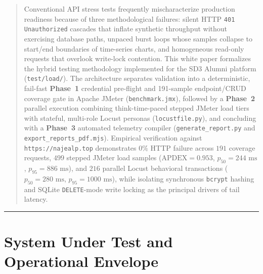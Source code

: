 \documentclass[11pt,letterpaper]{article}
\begin{document}
\begin{abstract}
\noindent Conventional API stress tests frequently mischaracterize production readiness because of three methodological failures: silent HTTP \texttt{401 Unauthorized} cascades that inflate synthetic throughput without exercising database paths, unpaced burst loops whose samples collapse to start/end boundaries of time-series charts, and homogeneous read-only requests that overlook write-lock contention. This white paper formalizes the hybrid testing methodology implemented for the SD3 Alumni platform (\texttt{test/load/}). The architecture separates validation into a deterministic, fail-fast \textbf{Phase~1} credential pre-flight and 191-sample endpoint/CRUD coverage gate in Apache JMeter (\texttt{benchmark.jmx}), followed by a \textbf{Phase~2} parallel execution combining think-time-paced stepped JMeter load tiers with stateful, multi-role Locust personas (\texttt{locustfile.py}), and concluding with a \textbf{Phase~3} automated telemetry compiler (\texttt{generate\_report.py} and \texttt{export\_reports\_pdf.mjs}). Empirical verification against \texttt{https://najealp.top} demonstrates $0\%$ HTTP failure across $191$ coverage requests, $499$ stepped JMeter load samples ($\text{APDEX} = 0.953$, $p_{50} = 244\text{ ms}$, $p_{95} = 886\text{ ms}$), and $216$ parallel Locust behavioral transactions ($p_{50} = 280\text{ ms}$, $p_{95} = 1000\text{ ms}$), while isolating synchronous \texttt{bcrypt} hashing and SQLite \texttt{DELETE}-mode write locking as the principal drivers of tail latency.
\end{abstract}

\vspace{6pt}
\tableofcontents
\vspace{8pt}
{\color{RuleGray}\hrule height 0.6pt}

\section{System Under Test and Operational Envelope}
\end{document}
